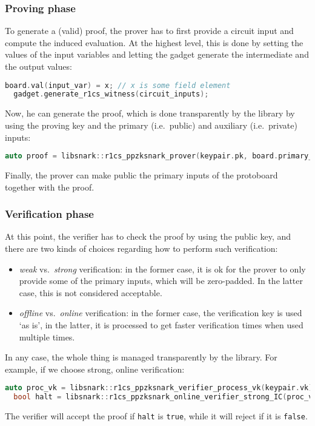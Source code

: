 \subsubsection*{Proving phase}
To generate a (valid) proof, the prover has to first provide a circuit input and compute the 
induced evaluation. 
At the highest level, this is done by setting the values of the input variables and letting the 
gadget generate the intermediate and the output values:
\begin{lstlisting}[language=C++]
  board.val(input_var) = x; // x is some field element
  gadget.generate_r1cs_witness(circuit_inputs);
\end{lstlisting}
Now, he can generate the proof, which is done transparently by the library by using the 
proving key and the primary (i.e.\ public) and auxiliary (i.e.\ private) inputs:
\begin{lstlisting}[language=C++]
  auto proof = libsnark::r1cs_ppzksnark_prover(keypair.pk, board.primary_input(), board.auxiliary_input());
\end{lstlisting}
Finally, the prover can make public the primary inputs of the protoboard together with the
proof.

\subsubsection*{Verification phase}
At this point, the verifier has to check the proof by using the public key, and there are two 
kinds of choices regarding how to perform such verification: 
\begin{itemize}
  \item \emph{weak} vs.\  \emph{strong} verification: in the former case, it is ok for the prover 
        to only provide some of the primary inputs, which will be zero-padded. 
        In the latter case, this is not considered acceptable.
  \item \emph{offline} vs.\  \emph{online} verification: in the former case, the verification key 
        is used `as is', in the latter, it is processed to get faster verification times when used 
        multiple times.
\end{itemize}
In any case, the whole thing is managed transparently by the library.
For example, if we choose strong, online verification:
\begin{lstlisting}[language=C++]
  auto proc_vk = libsnark::r1cs_ppzksnark_verifier_process_vk(keypair.vk);
  bool halt = libsnark::r1cs_ppzksnark_online_verifier_strong_IC(proc_vk, board.primary_input(), proof);
\end{lstlisting}
The verifier will accept the proof if \texttt{halt} is \texttt{true}, while it will reject if it 
is \texttt{false}.

